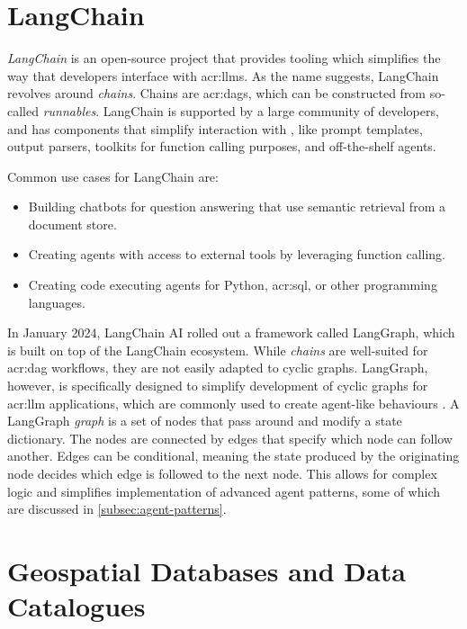 \section{LangChain}
\label{sec:langchain}

\textit{LangChain} \citep{langchainaiLangchainaiLangchain2022} is an open-source project that provides tooling which simplifies the way that developers interface with \glspl{acr:llm}. As the name suggests, LangChain revolves around \textit{chains}. Chains are \glspl{acr:dag}, which can be constructed from so-called \textit{runnables}. LangChain is supported by a large community of developers, and has components that simplify interaction with , like prompt templates, output parsers, toolkits for function calling purposes, and off-the-shelf agents.

Common use cases for LangChain are:

\begin{itemize}
    \item Building chatbots for question answering that use semantic retrieval from a document store.
    \item Creating agents with access to external tools by leveraging function calling.
    \item Creating code executing agents for Python, \acrshort{acr:sql}, or other programming languages.
\end{itemize}

In January 2024, LangChain AI rolled out a framework called LangGraph, which is built on top of the LangChain ecosystem. While \textit{chains} are well-suited for \gls{acr:dag} workflows, they are not easily adapted to cyclic graphs. LangGraph, however, is specifically designed to simplify development of cyclic graphs for \acrshort{acr:llm} applications, which are commonly used to create agent-like behaviours \citep{langchainaiLangchainaiLanggraph2024}. A LangGraph \textit{graph} is a set of nodes that pass around and modify a state dictionary. The nodes are connected by edges that specify which node can follow another. Edges can be conditional, meaning the state produced by the originating node decides which edge is followed to the next node. This allows for complex logic and simplifies implementation of advanced agent patterns, some of which are discussed in \autoref{subsec:agent-patterns}.


\section{Geospatial Databases and Data Catalogues}
\label{sec:geo-dbs-and-data-catalogues}

